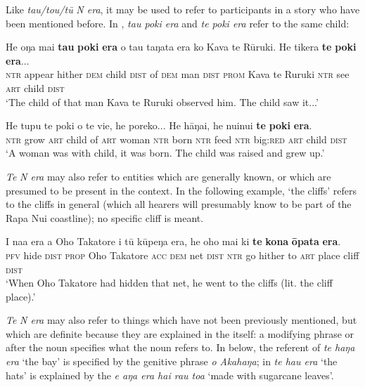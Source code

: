 Like \textit{tau/tou/tū} \textit{N era}, it may be used to refer to participants in a story who have been mentioned before. In , \textit{tau poki era} and \textit{te poki era} refer to the same child:

\ea\label{ex:4.201}
\gll He oŋa mai \textbf{tau} \textbf{poki} \textbf{era} o tau taŋata era ko Kava te Rūruki. He tikera \textbf{te} \textbf{poki} \textbf{era}...\\
\textsc{ntr} appear hither \textsc{dem} child \textsc{dist} of \textsc{dem} man \textsc{dist} \textsc{prom} Kava te Ruruki \textsc{ntr} see \textsc{art} child \textsc{dist}\\

\glt 
‘The child of that man Kava te Ruruki observed him. The child saw it...’ \textstyleExampleref{[Ley-9-57.035]}
\z

\ea\label{ex:4.202}
\gll He tupu te poki o te vi{\ꞌ}e, he poreko... He hāŋai, he nuinui  \textbf{te} \textbf{poki} \textbf{era}.\\
\textsc{ntr} grow \textsc{art} child of \textsc{art} woman \textsc{ntr} born \textsc{ntr} feed \textsc{ntr} big:\textsc{red}  \textsc{art} child \textsc{dist}\\

\glt
‘A woman was with child, it was born. The child was raised and grew up.’ \textstyleExampleref{[Mtx-7-21.004–005]}
\z

\textit{Te} \textit{N era} may also refer to entities which are generally known, or which are presumed to be present in the context. In the following example, ‘the cliffs’ refers to the cliffs in general (which all hearers will presumably know to be part of the Rapa Nui coastline); no specific cliff is meant.

\ea\label{ex:4.203}
\gll I na{\ꞌ}a era a {\ꞌ}Oho Takatore i tū kūpeŋa era, he oho mai  ki \textbf{te} \textbf{kona} \textbf{{\ꞌ}ōpata} \textbf{era}.\\
\textsc{pfv} hide \textsc{dist} \textsc{prop} Oho Takatore \textsc{acc} \textsc{dem} net \textsc{dist} \textsc{ntr} go hither  to \textsc{art} place cliff \textsc{dist}\\

\glt
‘When Oho Takatore had hidden that net, he went to the cliffs (lit. the cliff place).’ \textstyleExampleref{[R304.110]} 
\z

\textit{Te} \textit{N era} may also refer to things which have not been previously mentioned, but which are definite because they are explained in the  itself: a modifying phrase or  after the noun specifies what the noun refers to. In  below, the referent of \textit{te haŋa era} ‘the bay’ is specified by the genitive phrase \textit{o {\ꞌ}Akahaŋa}; in  \textit{te ha{\ꞌ}u era} ‘the hats’ is explained by the  \textit{e aŋa era hai rau toa} ‘made with sugarcane leaves’.

